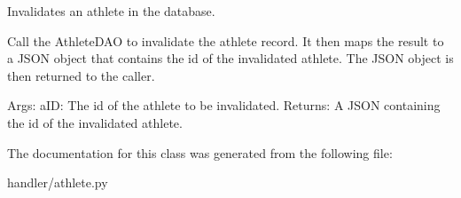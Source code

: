 \begin{DoxyVerb}Invalidates an athlete in the database.

Call the AthleteDAO to invalidate the athlete record. It then
maps the result to a JSON object that contains the id of the 
invalidated athlete. The JSON object is then returned to the caller.

Args:
    aID: The id of the athlete to be invalidated.
Returns:
    A JSON containing the id of the invalidated athlete.
\end{DoxyVerb}
 

The documentation for this class was generated from the following file\+:\begin{DoxyCompactItemize}
\item 
handler/athlete.\+py\end{DoxyCompactItemize}

